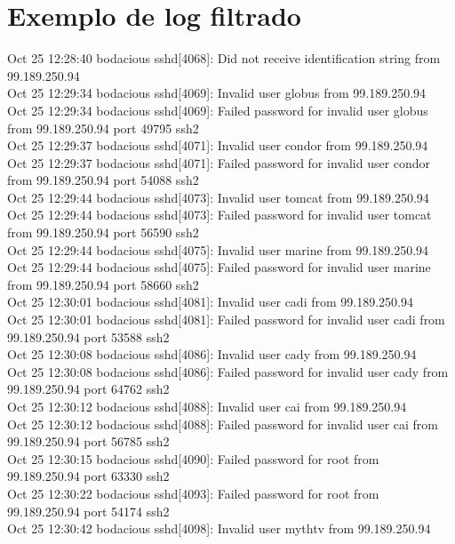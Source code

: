 \chapter{Exemplo de log filtrado}
\label{anexo:log_filtrado}

\scriptsize{
Oct 25 12:28:40 bodacious sshd[4068]: Did not receive identification string from 99.189.250.94\\
Oct 25 12:29:34 bodacious sshd[4069]: Invalid user globus from 99.189.250.94\\
Oct 25 12:29:34 bodacious sshd[4069]: Failed password for invalid user globus from 99.189.250.94 port 49795 ssh2\\
Oct 25 12:29:37 bodacious sshd[4071]: Invalid user condor from 99.189.250.94\\
Oct 25 12:29:37 bodacious sshd[4071]: Failed password for invalid user condor from 99.189.250.94 port 54088 ssh2\\
Oct 25 12:29:44 bodacious sshd[4073]: Invalid user tomcat from 99.189.250.94\\
Oct 25 12:29:44 bodacious sshd[4073]: Failed password for invalid user tomcat from 99.189.250.94 port 56590 ssh2\\
Oct 25 12:29:44 bodacious sshd[4075]: Invalid user marine from 99.189.250.94\\
Oct 25 12:29:44 bodacious sshd[4075]: Failed password for invalid user marine from 99.189.250.94 port 58660 ssh2\\
Oct 25 12:30:01 bodacious sshd[4081]: Invalid user cadi from 99.189.250.94\\
Oct 25 12:30:01 bodacious sshd[4081]: Failed password for invalid user cadi from 99.189.250.94 port 53588 ssh2\\
Oct 25 12:30:08 bodacious sshd[4086]: Invalid user cady from 99.189.250.94\\
Oct 25 12:30:08 bodacious sshd[4086]: Failed password for invalid user cady from 99.189.250.94 port 64762 ssh2\\
Oct 25 12:30:12 bodacious sshd[4088]: Invalid user cai from 99.189.250.94\\
Oct 25 12:30:12 bodacious sshd[4088]: Failed password for invalid user cai from 99.189.250.94 port 56785 ssh2\\
Oct 25 12:30:15 bodacious sshd[4090]: Failed password for root from 99.189.250.94 port 63330 ssh2\\
Oct 25 12:30:22 bodacious sshd[4093]: Failed password for root from 99.189.250.94 port 54174 ssh2\\
Oct 25 12:30:42 bodacious sshd[4098]: Invalid user mythtv from 99.189.250.94\\
}
